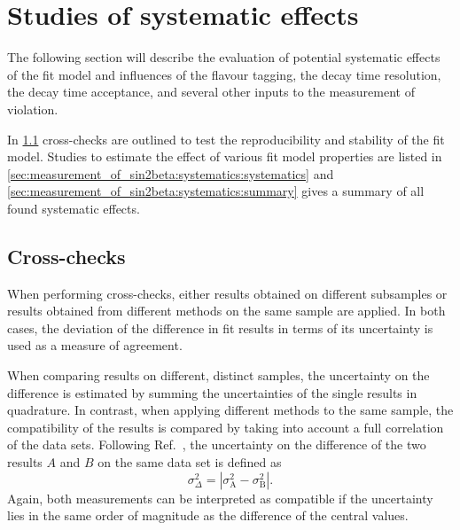 
\section{Studies of systematic effects}
\label{sec:measurement_of_sin2beta:systematics}

The following section will describe the evaluation of potential systematic
effects of the fit model and influences of the flavour tagging, the decay time
resolution, the decay time acceptance, and several other inputs to the
measurement of \CP violation.

In \cref{sec:measurement_of_sin2beta:systematics:cross_checks} cross-checks are
outlined to test the reproducibility and stability of the fit model. Studies to
estimate the effect of various fit model properties are listed in
\cref{sec:measurement_of_sin2beta:systematics:systematics} and
\cref{sec:measurement_of_sin2beta:systematics:summary} gives a summary of all
found systematic effects.

\subsection{Cross-checks}
\label{sec:measurement_of_sin2beta:systematics:cross_checks}

When performing cross-checks, either results obtained on different subsamples or
results obtained from different methods on the same sample are applied. In both
cases, the deviation of the difference in fit results in terms of its
uncertainty is used as a measure of agreement.

When comparing results on different, distinct samples, the uncertainty on the
difference is estimated by summing the uncertainties of the single results in
quadrature. In contrast, when applying different methods to the same sample, the
compatibility of the results is compared by taking into account a full
correlation of the data sets. Following Ref.~\cite{Barlow:2002yb}, the
uncertainty on the difference of the two results $A$ and $B$ on the same data
set is defined as
%
\begin{equation}
  \sigma^2_\Delta = \left\vert\sigma^2_{\text{A}} - \sigma^2_{\text{B}}\right\vert .
\end{equation}
%
Again, both measurements can be interpreted as compatible if the uncertainty
lies in the same order of magnitude as the difference of the central values.

